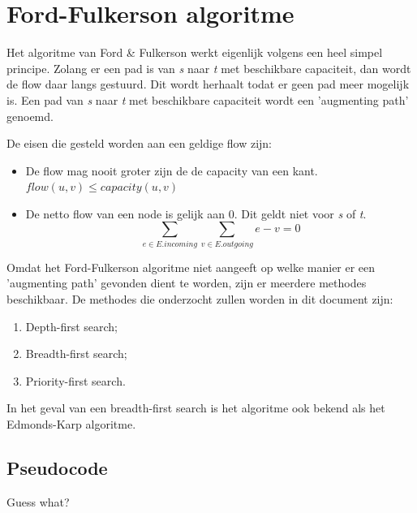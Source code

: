 \section{Ford-Fulkerson algoritme}
\label{sec:fordfulkerson}

Het algoritme van Ford \& Fulkerson werkt eigenlijk volgens een heel simpel principe. Zolang er een pad is van \textit{s} naar \textit{t} met beschikbare capaciteit, dan wordt de flow daar langs gestuurd. Dit wordt herhaalt todat er geen pad meer mogelijk is. Een pad van \textit{s} naar \textit{t} met beschikbare capaciteit wordt een 'augmenting path' genoemd.

De eisen die gesteld worden aan een geldige flow zijn:

\begin{itemize}
	\item De flow mag nooit groter zijn de de capacity van een kant. $flow(u,v) \leq capacity(u,v)$
	\item De netto flow van een node is gelijk aan 0. Dit geldt niet voor \textit{s} of \textit{t}.$$\sum_{e \in E.incoming}\sum_{v \in E.outgoing}{e-v} = 0$$
\end{itemize}

Omdat het Ford-Fulkerson algoritme niet aangeeft op welke manier er een 'augmenting path' gevonden dient te worden, zijn er meerdere methodes beschikbaar.
De methodes die onderzocht zullen worden in dit document zijn:

\begin{enumerate}
	\item Depth-first search;
	\item Breadth-first search;
	\item Priority-first search.
\end{enumerate}

In het geval van een breadth-first search is het algoritme ook bekend als het Edmonds-Karp algoritme.

\subsection{Pseudocode}

Guess what?